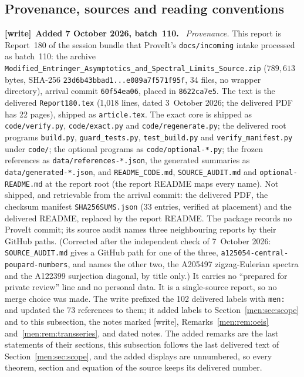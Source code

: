 \documentclass[11pt,letterpaper]{article}
\theoremstyle{remark}\newtheorem{remark}[theorem]{Remark}
\newcommand{\file}[1]{\nolinkurl{#1}}
\newenvironment{writenote}[1][]{\par\smallskip\begingroup\small
 \noindent\textbf{[write]}\if\relax\detokenize{#1}\relax\else~\textbf{#1.}\fi\ }%
 {\par\endgroup\smallskip}
\begin{document}
\subsection{Provenance, sources and reading conventions}\label{men:sec:provenance}
\begin{writenote}[Added 7 October 2026, batch~110]
\emph{Provenance.} This report is Report~180 of the session bundle that
ProveIt's \file{docs/incoming} intake processed as batch~110: the archive
\file{Modified_Entringer_Asymptotics_and_Spectral_Limits_Source.zip}
($789{,}613$ bytes, SHA-256 \file{23d6b43bbad1...e089a7f571f95f}, 34 files,
no wrapper directory), arrival commit \file{60f54ea06}, placed in
\file{8622ca7e5}. The text is the delivered \file{Report180.tex} (1{,}018
lines, dated 3~October 2026; the delivered PDF has 22 pages), shipped as
\file{article.tex}. The exact core is shipped as \file{code/verify.py},
\file{code/exact.py} and \file{code/regenerate.py}; the delivered root
programs \file{build.py}, \file{guard_tests.py}, \file{test_build.py} and
\file{verify_manifest.py} under \file{code/}; the optional programs as
\file{code/optional-*.py}; the frozen references as
\file{data/references-*.json}, the generated summaries as
\file{data/generated-*.json}, and \file{README_CODE.md},
\file{SOURCE_AUDIT.md} and \file{optional-README.md} at the report root (the
report README maps every name). Not shipped, and retrievable from the arrival
commit: the delivered PDF, the checksum manifest \file{SHA256SUMS.json}
(33 entries, verified at placement) and the delivered README, replaced by the
report README. The package records no ProveIt commit; its source audit names
three neighbouring reports by their GitHub paths. (Corrected after the
independent check of 7~October 2026: \file{SOURCE_AUDIT.md} gives a GitHub
path for one of the three, \file{a125054-central-poupard-numbers}, and names
the other two, the A205497 zigzag-Eulerian spectra and the A122399
surjection diagonal, by title only.) It carries no ``prepared for
private review'' line and no personal data. It is a single-source report, so
no merge choice was made. The write prefixed the 102 delivered labels with
\file{men:} and updated the 73 references to them; it added labels to
Section~\ref{men:sec:scope} and to this subsection, the notes marked [write],
Remarks~\ref{men:rem:oeis} and~\ref{men:rem:transseries}, and dated notes.
The added remarks are the last statements of their sections, this subsection
follows the last delivered text of Section~\ref{men:sec:scope}, and the added
displays are unnumbered, so every theorem, section and equation of the source
keeps its delivered number.


\end{writenote}
\end{document}
